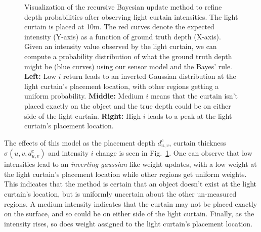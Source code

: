 \begin{figure}[h]
\begin{minipage}{0.5\textwidth}
  \end{minipage}\hfill
   \centering
   \caption{Visualization of the recursive Bayesian update method to refine depth probabilities after observing light curtain intensities. The light curtain is placed at 10m. The red curves denote the expected intensity (Y-axis) as a function of ground truth depth (X-axis). Given an intensity value observed by the light curtain, we can compute a probability distribution of what the ground truth depth might be (blue curves) using our sensor model and the Bayes' rule. \textbf{Left:} Low $i$ return leads to an inverted Gaussian distribution at the light curtain's placement location, with other regions getting a uniform probability. \textbf{Middle:} Medium $i$ means that the curtain isn't placed exactly on the object and the true depth could be on either side of the light curtain. \textbf{Right:} High $i$ leads to a peak at the light curtain's placement location.}
   \label{fig:updatemodel}
\end{figure}

The effects of this model as the placement depth $d^c_{u, v}$, curtain thickness $\sigma(u, v, d^c_{u, v})$ and intensity $i$ change is seen in Fig.~\ref{fig:updatemodel}. One can observe that low intensities lead to an \textit{inverting gaussian} like weight updates, with a low weight at the light curtain's placement location while other regions get uniform weights. This indicates that the method is certain that an object doesn't exist at the light curtain's location, but is uniformly uncertain about the other un-measured regions. A medium intensity indicates that the curtain may not be placed exactly on the surface, and so could be on either side of the light curtain. Finally, as the intensity rises, so does weight assigned to the light curtain's placement location.
